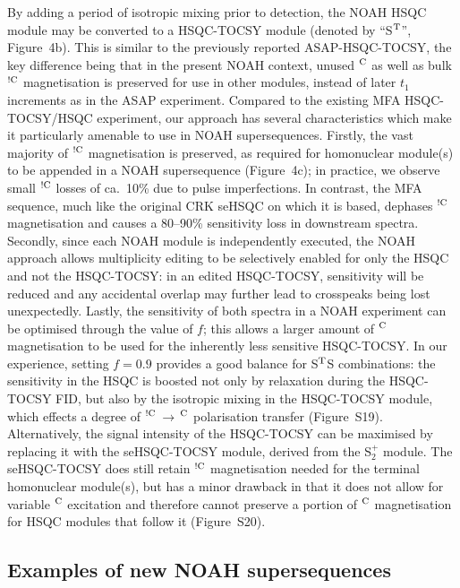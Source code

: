 \documentclass[final,twocolumn]{elsarticle}
\newcommand*{\noahS}{S}
\newcommand*{\noahSpb}{S$^+_2$}
\newcommand*{\noahSt}{S$\rm ^T$}
\newcommand*{\magn}[1]{\ce{^1H}$^{#1}$}
\newcommand*{\magnnot}[1]{\ce{^1H}$^{!#1}$}
\begin{document}
By adding a period of isotropic mixing prior to detection, the NOAH HSQC module may be converted to a HSQC-TOCSY module (denoted by ``\noahSt{}'', Figure~4b).
This is similar to the previously reported ASAP-HSQC-TOCSY,\cite{Becker2019JMR} the key difference being that in the present NOAH context, unused \magn{\ce{C}} as well as bulk \magnnot{\ce{C}} magnetisation is preserved for use in other modules, instead of later $t_1$ increments as in the ASAP experiment.
Compared to the existing MFA HSQC-TOCSY/HSQC experiment,\cite{Nolis2019CPC} our approach has several characteristics which make it particularly amenable to use in NOAH supersequences.
Firstly, the vast majority of \magnnot{\ce{C}} magnetisation is preserved, as required for homonuclear module(s) to be appended in a NOAH supersequence (Figure~4c); in practice, we observe small \magnnot{\ce{C}} losses of ca.\ 10\% due to pulse imperfections.
In contrast, the MFA sequence, much like the original CRK seHSQC on which it is based, dephases \magnnot{\ce{C}} magnetisation and causes a 80--90\% sensitivity loss in downstream spectra.
Secondly, since each NOAH module is independently executed, the NOAH approach allows multiplicity editing to be selectively enabled for only the HSQC and not the HSQC-TOCSY: in an edited HSQC-TOCSY, sensitivity will be reduced and any accidental overlap may further lead to crosspeaks being lost unexpectedly.
Lastly, the sensitivity of both spectra in a NOAH experiment can be optimised through the value of $f$; this allows a larger amount of \magn{\ce{C}} magnetisation to be used for the inherently less sensitive HSQC-TOCSY.
In our experience, setting $f = 0.9$ provides a good balance for \noahSt{}\noahS{} combinations: the sensitivity in the HSQC is boosted not only by relaxation during the HSQC-TOCSY FID, but also by the isotropic mixing in the HSQC-TOCSY module, which effects a degree of \magnnot{\ce{C}}\,$\to\,$\magn{\ce{C}} polarisation transfer (Figure~S19).
Alternatively, the signal intensity of the HSQC-TOCSY can be maximised by replacing it with the seHSQC-TOCSY module, derived from the \noahSpb{} module.\cite{Hansen2021AC}
The seHSQC-TOCSY does still retain \magnnot{\ce{C}} magnetisation needed for the terminal homonuclear module(s), but has a minor drawback in that it does not allow for variable \magn{\ce{C}} excitation and therefore cannot preserve a portion of \magn{\ce{C}} magnetisation  for HSQC modules that follow it (Figure~S20).

\subsection{Examples of new NOAH supersequences}
\end{document}
